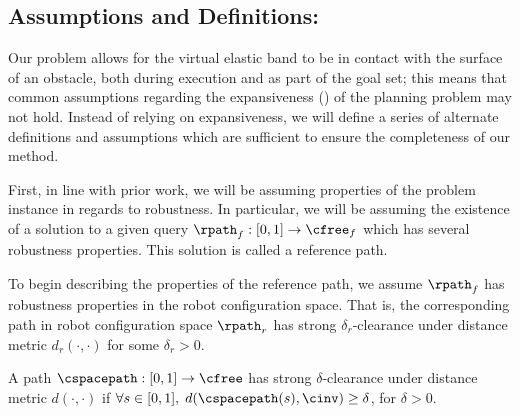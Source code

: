 \subsection{Assumptions and Definitions:}
\label{sec:rpath_assumptions}
Our problem allows for the virtual elastic band to be in contact with the surface of an obstacle, both during execution and as part of the goal set; this means that common assumptions regarding the expansiveness (\cite{Hsu1999}) of the planning problem may not hold. Instead of relying on expansiveness, we will define a series of alternate definitions and assumptions which are sufficient to ensure the completeness of our method.



First, in line with prior work, we will be assuming properties of the problem instance in regards to robustness.  In particular, we will be assuming the existence of a solution to a given query $\rpath_f : [0, 1] \rightarrow \cfree_f$ which has several robustness properties.  This solution is called a reference path.






To begin describing the properties of the reference path, we assume $\rpath_f$ has robustness properties in the robot configuration space.  That is, the corresponding path in robot configuration space $\rpath_r$ has strong $\delta_r$-clearance under distance metric $d_r(\cdot,\cdot)$ for some $\delta_r > 0$.

\begin{definition}
    A path $\cspacepath : [0, 1] \rightarrow \cfree$ has strong $\delta$-clearance under distance metric $d(\cdot,\cdot)$ if $\forall s \in [0, 1],\; d(\cspacepath(s),\cinv) \geq \delta$, for $\delta > 0$.
\end{definition}


